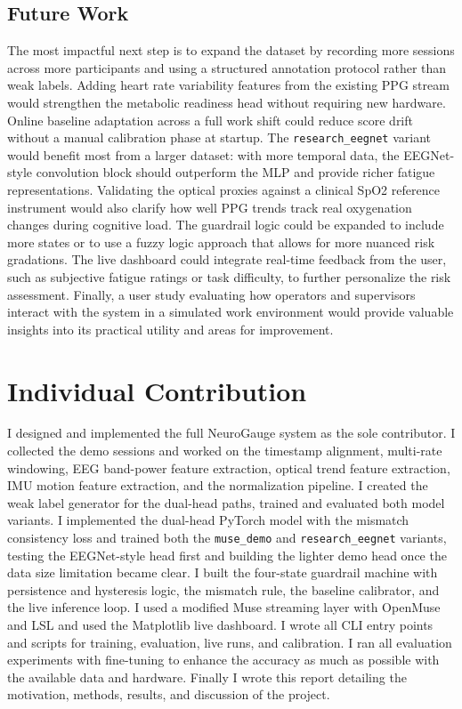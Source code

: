 \documentclass[conference]{IEEEtran}
\begin{document}
\subsection{Future Work}

The most impactful next step is to expand the dataset by recording more sessions across more participants and using a structured annotation protocol rather than weak labels. Adding heart rate variability features from the existing PPG stream would strengthen the metabolic readiness head without requiring new hardware. Online baseline adaptation across a full work shift could reduce score drift without a manual calibration phase at startup. The \texttt{research\_eegnet} variant would benefit most from a larger dataset: with more temporal data, the EEGNet-style convolution block should outperform the MLP and provide richer fatigue representations. Validating the optical proxies against a clinical SpO2 reference instrument would also clarify how well PPG trends track real oxygenation changes during cognitive load. The guardrail logic could be expanded to include more states or to use a fuzzy logic approach that allows for more nuanced risk gradations. The live dashboard could integrate real-time feedback from the user, such as subjective fatigue ratings or task difficulty, to further personalize the risk assessment. Finally, a user study evaluating how operators and supervisors interact with the system in a simulated work environment would provide valuable insights into its practical utility and areas for improvement.

\section{Individual Contribution}

I designed and implemented the full NeuroGauge system as the sole contributor. I collected the demo sessions and worked on the timestamp alignment, multi-rate windowing, EEG band-power feature extraction, optical trend feature extraction, IMU motion feature extraction, and the normalization pipeline. I created the weak label generator for the dual-head paths, trained and evaluated both model variants. I implemented the dual-head PyTorch model with the mismatch consistency loss and trained both the \texttt{muse\_demo} and \texttt{research\_eegnet} variants, testing the EEGNet-style head first and building the lighter demo head once the data size limitation became clear. I built the four-state guardrail machine with persistence and hysteresis logic, the mismatch rule, the baseline calibrator, and the live inference loop. I used a modified Muse streaming layer with OpenMuse and LSL and used the Matplotlib live dashboard. I wrote all CLI entry points and scripts for training, evaluation, live runs, and calibration. I ran all evaluation experiments with fine-tuning to enhance the accuracy as much as possible with the available data and hardware. Finally I wrote this report detailing the motivation, methods, results, and discussion of the project.
\end{document}
